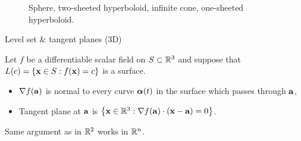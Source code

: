 \begin{figure}
    \begin{minipage}[c]{0.5\textwidth}
    \end{minipage}%
    \begin{minipage}[c]{0.5\textwidth}
    \end{minipage}
    \caption{Sphere, two-sheeted hyperboloid, infinite cone, one-sheeted hyperboloid.}
\end{figure}









{Level set \& tangent planes (3D)}





Let \(f\) be a differentiable scalar field on \(S\subset \bR^3\) and suppose that \(L(c) = \left\{\xx\in S : f(\xx)=c\right\}\) is a surface.


\begin{itemize}
    \item \(\nabla f(\aa)\) is normal to every curve \(\aalpha(t)\) in the surface which passes through \(\aa\),
    \item Tangent plane at \(\aa\) is
          \(\left\{\xx\in\bR^3: \nabla f(\aa) \cdot (\xx-\aa)=0\right\}\).
\end{itemize}

Same argument as in \(\bR^2\) works in \(\bR^n\).




